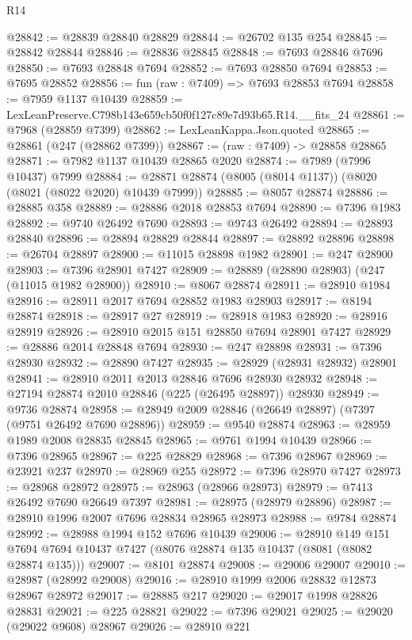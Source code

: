 \begin{lexlean}{R14}
\begin{coremodule}
@28842 := @28839 @28840 @28829
@28844 := @26702 @135 @254
@28845 := @28842 @28844
@28846 := @28836 @28845
@28848 := @7693 @28846 @7696
@28850 := @7693 @28848 @7694
@28852 := @7693 @28850 @7694
@28853 := @7695 @28852
@28856 := fun (raw : @7409) => @7693 @28853 @7694
@28858 := @7959 @1137 @10439
@28859 := LexLeanPreserve.C798b143e659cb50f0f127c89e7d93b65.R14.__fits_24
@28861 := @7968 (@28859 @7399)
@28862 := LexLeanKappa.Json.quoted
@28865 := @28861 (@247 (@28862 @7399))
@28867 := (raw : @7409) -> @28858 @28865
@28871 := @7982 @1137 @10439 @28865 @2020
@28874 := @7989 (@7996 @10437) @7999
@28884 := @28871 @28874 (@8005 (@8014 @1137)) (@8020 (@8021 (@8022 @2020) @10439 @7999))
@28885 := @8057 @28874
@28886 := @28885 @358
@28889 := @28886 @2018 @28853 @7694
@28890 := @7396 @1983
@28892 := @9740 @26492 @7690
@28893 := @9743 @26492
@28894 := @28893 @28840
@28896 := @28894 @28829 @28844
@28897 := @28892 @28896
@28898 := @26704 @28897
@28900 := @11015 @28898 @1982
@28901 := @247 @28900
@28903 := @7396 @28901 @7427
@28909 := @28889 (@28890 @28903) (@247 (@11015 @1982 @28900))
@28910 := @8067 @28874
@28911 := @28910 @1984
@28916 := @28911 @2017 @7694 @28852 @1983 @28903
@28917 := @8194 @28874
@28918 := @28917 @27
@28919 := @28918 @1983
@28920 := @28916 @28919
@28926 := @28910 @2015 @151 @28850 @7694 @28901 @7427
@28929 := @28886 @2014 @28848 @7694
@28930 := @247 @28898
@28931 := @7396 @28930
@28932 := @28890 @7427
@28935 := @28929 (@28931 @28932) @28901
@28941 := @28910 @2011 @2013 @28846 @7696 @28930 @28932
@28948 := @27194 @28874 @2010 @28846 (@225 (@26495 @28897)) @28930
@28949 := @9736 @28874
@28958 := @28949 @2009 @28846 (@26649 @28897) (@7397 (@9751 @26492 @7690 @28896))
@28959 := @9540 @28874
@28963 := @28959 @1989 @2008 @28835 @28845
@28965 := @9761 @1994 @10439
@28966 := @7396 @28965
@28967 := @225 @28829
@28968 := @7396 @28967
@28969 := @23921 @237
@28970 := @28969 @255
@28972 := @7396 @28970 @7427
@28973 := @28968 @28972
@28975 := @28963 (@28966 @28973)
@28979 := @7413 @26492 @7690 @26649 @7397
@28981 := @28975 (@28979 @28896)
@28987 := @28910 @1996 @2007 @7696 @28834 @28965 @28973
@28988 := @9784 @28874
@28992 := @28988 @1994 @152 @7696 @10439
@29006 := @28910
    @149
    @151
    @7694
    @7694
    @10437
    @7427
    (@8076 @28874 @135 @10437 (@8081 (@8082 @28874 @135)))
@29007 := @8101 @28874
@29008 := @29006 @29007
@29010 := @28987 (@28992 @29008)
@29016 := @28910 @1999 @2006 @28832 @12873 @28967 @28972
@29017 := @28885 @217
@29020 := @29017 @1998 @28826 @28831
@29021 := @225 @28821
@29022 := @7396 @29021
@29025 := @29020 (@29022 @9608) @28967
@29026 := @28910 @221

\end{coremodule}
\end{lexlean}
